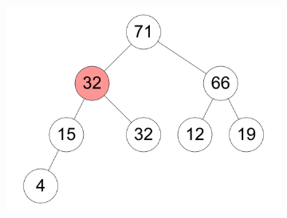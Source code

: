 \documentclass[11pt,a4paper]{article}
\begin{document}
\begin{loesung}
\begin{enumerate}
\begin{figure}[h!]
\begin{subfigure}[b]{0.23\textwidth}
                \includegraphics[width=\textwidth]{img/a10}
            \end{subfigure}
        \end{figure}
        \FloatBarrier


\end{enumerate}
\end{loesung}
\end{document}
